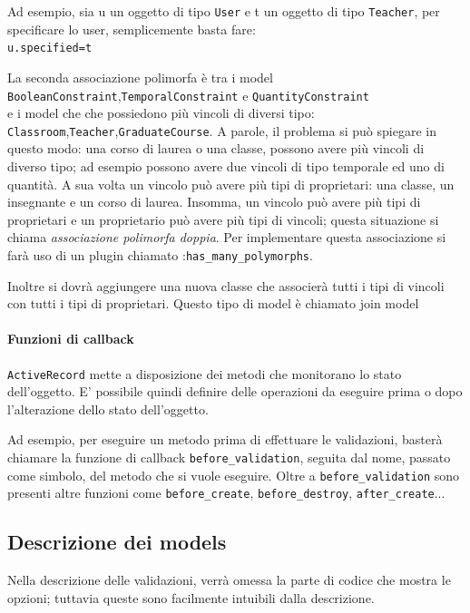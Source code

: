 \documentclass[11pt,a4paper]{article}
\begin{document}
Ad esempio, sia u un oggetto di tipo \verb|User| e t un oggetto di tipo \verb|Teacher|, per specificare lo user, semplicemente basta fare:\\
\verb|u.specified=t|

La seconda associazione polimorfa è tra i model\\ 
\verb|BooleanConstraint|,\verb|TemporalConstraint| e \verb|QuantityConstraint|\\ 
e i model che che possiedono più vincoli di diversi tipo:\\
\verb|Classroom|,\verb|Teacher|,\verb|GraduateCourse|.
A parole, il problema si può spiegare in questo modo: una corso di laurea o una classe, possono avere più vincoli di diverso tipo; ad esempio possono avere due vincoli di tipo temporale ed uno di quantità. A sua volta un vincolo può avere più tipi di proprietari: una classe, un insegnante e un corso di laurea.
Insomma, un vincolo può avere più tipi di proprietari e un proprietario può avere più tipi di vincoli; questa situazione si chiama \textit{associazione polimorfa doppia}.
Per implementare questa associazione si farà uso di un plugin chiamato :\verb|has_many_polymorphs|. 


Inoltre si dovrà aggiungere una nuova classe che associerà tutti i tipi di vincoli con tutti i tipi di proprietari. Questo tipo di model è chiamato join model




\paragraph{Funzioni di callback}
\verb|ActiveRecord| mette a disposizione dei metodi che monitorano lo stato dell'oggetto. 
E' possibile quindi definire delle operazioni da eseguire prima o dopo l'alterazione dello stato dell'oggetto.


Ad esempio, per eseguire un metodo prima di effettuare le validazioni, basterà chiamare la funzione di callback \verb|before_validation|, seguita dal nome, passato come simbolo, del metodo che si vuole eseguire.
Oltre a \verb|before_validation| sono presenti altre funzioni come \verb|before_create|, \verb|before_destroy|, \verb|after_create|...  

\subsection{Descrizione dei models}
Nella descrizione delle validazioni, verrà omessa la parte di codice che mostra le opzioni; tuttavia queste sono facilmente intuibili dalla descrizione.
\end{document}
